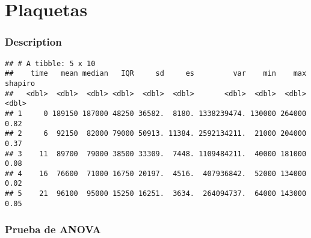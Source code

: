 \documentclass[
]{article}
\begin{document}
\hypertarget{plaquetas}{%
\section{Plaquetas}\label{plaquetas}}

\hypertarget{description-2}{%
\subsubsection{Description}\label{description-2}}

\begin{verbatim}
## # A tibble: 5 x 10
##    time   mean median   IQR     sd     es         var    min    max shapiro
##   <dbl>  <dbl>  <dbl> <dbl>  <dbl>  <dbl>       <dbl>  <dbl>  <dbl>   <dbl>
## 1     0 189150 187000 48250 36582.  8180. 1338239474. 130000 264000    0.82
## 2     6  92150  82000 79000 50913. 11384. 2592134211.  21000 204000    0.37
## 3    11  89700  79000 38500 33309.  7448. 1109484211.  40000 181000    0.08
## 4    16  76600  71000 16750 20197.  4516.  407936842.  52000 134000    0.02
## 5    21  96100  95000 15250 16251.  3634.  264094737.  64000 143000    0.05
\end{verbatim}

\hypertarget{prueba-de-anova-2}{%
\subsubsection{Prueba de ANOVA}\label{prueba-de-anova-2}}
\end{document}
